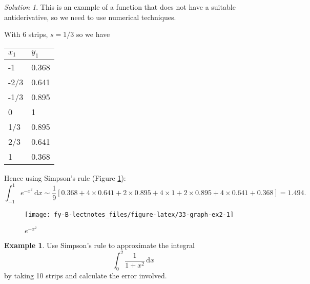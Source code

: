 \documentclass[
  english,
  11pt,
  oneside]{book}
\newcommand{\slide}{}
\theoremstyle{definition}
\theoremstyle{definition}
\newtheorem{example}{Example}[chapter]
\theoremstyle{definition}
\theoremstyle{definition}
\theoremstyle{remark}
\newtheorem*{solution}{Solution}
\begin{document}
\begin{solution}

This is an example of a function that does not have a suitable antiderivative, so we need to use numerical techniques.

With 6 strips, \(s=1/3\) so we have

\begin{tabular}{l|l}
\hline
$x_1$ & $y_1$\\
\hline
-1 & 0.368\\
\hline
-2/3 & 0.641\\
\hline
-1/3 & 0.895\\
\hline
0 & 1\\
\hline
1/3 & 0.895\\
\hline
2/3 & 0.641\\
\hline
1 & 0.368\\
\hline
\end{tabular}

Hence using Simpson's rule (Figure \ref{fig:33-graph-ex2}):
\[
\int_{-1}^1e^{-x^2}\,\mathrm{d}x \sim \frac19\left[0.368 + 4\times0.641+2\times0.895+4\times1+2\times0.895+4\times0.641+0.368\right] = 1.494.
\]

\begin{figure}

{\centering \texttt{[image: fy-B-lectnotes\_files/figure-latex/33-graph-ex2-1]} 

}

\caption{$e^{-x^2}$}\label{fig:33-graph-ex2}
\end{figure}

\end{solution}

\slide

\begin{slidesonly}

\hbox{}
\slide
\hbox{}
\slide

\end{slidesonly}

\begin{example}
Use Simpson's rule to approximate the integral
\[
\int_0^2\frac1{1+x^2}\,\mathrm{d}x
\]
by taking 10 strips and calculate the error involved.
\end{example}
\end{document}
